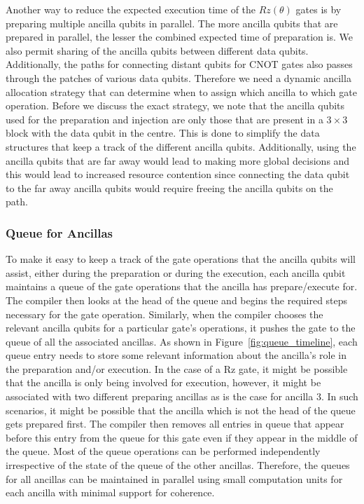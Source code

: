 Another way to reduce the expected execution time of the $Rz(\theta)$ gates is by preparing multiple ancilla qubits in parallel. The more ancilla qubits that are prepared in parallel, the lesser the combined expected time of preparation is. We also permit sharing of the ancilla qubits between different data qubits. Additionally, the paths for connecting distant qubits for CNOT gates also passes through the patches of various data qubits. Therefore we need a dynamic ancilla allocation strategy that can determine when to assign which ancilla to which gate operation. Before we discuss the exact strategy, we note that the ancilla qubits used for the preparation and injection are only those that are present in a $3\times 3$ block with the data qubit in the centre. This is done to simplify the data structures that keep a track of the different ancilla qubits. Additionally, using the ancilla qubits that are far away would lead to making more global decisions and this would lead to increased resource contention since connecting the data qubit to the far away ancilla qubits would require freeing the ancilla qubits on the path.

\subsubsection{Queue for Ancillas}
To make it easy to keep a track of the gate operations that the ancilla qubits will assist, either during the preparation or during the execution, each ancilla qubit maintains a queue of the gate operations that the ancilla has prepare/execute for. The compiler then looks at the head of the queue and begins the required steps necessary for the gate operation. Similarly, when the compiler chooses the relevant ancilla qubits for a particular gate's operations, it pushes the gate to the queue of all the associated ancillas. As shown in Figure~\ref{fig:queue_timeline}, each queue entry needs to store some relevant information about the ancilla's role in the preparation and/or execution. In the case of a Rz gate, it might be possible that the ancilla is only being involved for execution, however, it might be associated with two different preparing ancillas as is the case for ancilla $3$. In such scenarios, it might be possible that the ancilla which is not the head of the queue gets prepared first. The compiler then removes all entries in queue that appear before this entry from the queue for this gate even if they appear in the middle of the queue. Most of the queue operations can be performed independently irrespective of the state of the queue of the other ancillas. Therefore, the queues for all ancillas can be maintained in parallel using small computation units for each ancilla with minimal support for coherence.

